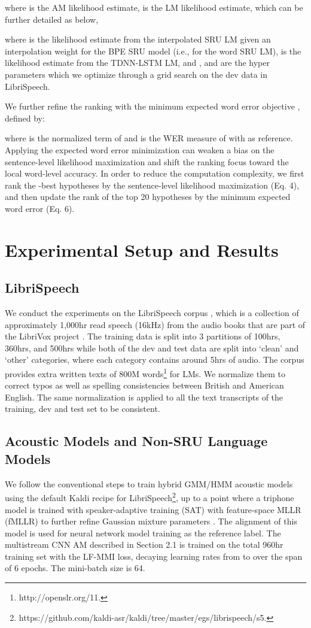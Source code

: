 \documentclass[a4paper]{article}
\begin{document}
where  is the AM likelihood estimate,  is the LM likelihood estimate, which can be further detailed as below,

where  is the likelihood estimate from the interpolated SRU LM given an interpolation weight  for the BPE SRU model (i.e.,  for the word SRU LM),  is the likelihood estimate from the TDNN-LSTM LM, and ,  and  are the hyper parameters which we optimize through a grid search on the dev data in LibriSpeech.

We further refine the ranking with the minimum expected word error objective \cite{stolcke1997explicit}, defined by:

where  is the normalized term of  and  is the WER measure of  with  as reference. Applying the expected word error minimization can weaken a bias on the sentence-level likelihood maximization and shift the ranking focus toward the local word-level accuracy. In order to reduce the computation complexity, we first rank the -best hypotheses by the sentence-level likelihood maximization (Eq. 4), and then update the rank of the top 20 hypotheses by the minimum expected word error (Eq. 6).


\section{Experimental Setup and Results}



\subsection{LibriSpeech}
We conduct the experiments on the LibriSpeech corpus \cite{panayotov2015librispeech}, which is a collection of approximately 1,000hr read speech (16kHz) from the audio books that are part of the LibriVox project \cite{librivox14}. The training data is split into 3 partitions of 100hrs, 360hrs, and 500hrs while both of the dev and test data are split into `clean’ and `other’ categories, where each category contains around 5hrs of audio. The corpus provides extra written texts of 800M words\footnote{http://openslr.org/11.} for LMs. We normalize them to correct typos as well as spelling consistencies between British and American English. The same normalization is applied to all the text transcripts of the training, dev and test set to be consistent. 


\subsection{Acoustic Models and Non-SRU Language Models}
We follow the conventional steps to train hybrid GMM/HMM acoustic models using the default Kaldi recipe for LibriSpeech\footnote{https://github.com/kaldi-asr/kaldi/tree/master/egs/librispeech/s5.}, up to a point where a triphone model is trained with speaker-adaptive training (SAT) with feature-space MLLR (fMLLR) to further refine Gaussian mixture parameters \cite{Gales97}. The alignment of this model is used for neural network model training as the reference label. The multistream CNN AM described in Section 2.1 is trained on the total 960hr training set with the LF-MMI loss, decaying learning rates from  to  over the span of 6 epochs. The mini-batch size is 64.  
\end{document}
